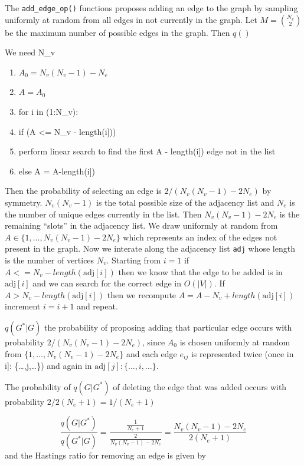 \documentclass[]{article}
\providecommand{\tightlist}{%
  \setlength{\itemsep}{0pt}\setlength{\parskip}{0pt}}
\numberwithin{equation}{section}
\begin{document}
The \texttt{add\_edge\_op()} functions proposes adding an edge to the
graph by sampling uniformly at random from all edges in not currently in
the graph. Let \(M = \binom{N_v}{2}\) be the maximum number of possible
edges in the graph. Then \(q()\)

We need N\_v

\begin{enumerate}
\def\labelenumi{\arabic{enumi}.}
\tightlist
\item
  \(A_0 = N_v(N_v-1) - N_e\)
\item
  \(A = A_0\)
\item
  for i in (1:N\_v):
\item
  if (A \textless{}= N\_v - length(\text{adj}{[}i{]}))
\item
  perform linear search to find the first A - length(\text{adj}{[}i{]})
  edge not in the list
\item
  else A = A-length(\text{adj}{[}i{]})
\end{enumerate}

Then the probability of selecting an edge is \(2/(N_v(N_v-1) - 2N_e)\)
by symmetry. \(N_v(N_v-1)\) is the total possible size of the adjacency
list and \(N_e\) is the number of unique edges currently in the list.
Then \(N_v(N_v-1) - 2N_e\) is the remaining ``slots'' in the adjacency
list. We draw uniformly at random from
\(A \in \{1,\dots,N_v(N_v-1) - 2N_e\}\) which represents an index of the
edges not present in the graph. Now we interate along the adjacency list
\texttt{adj} whose length is the number of vertices \(N_v\). Starting
from \(i = 1\) if \(A <= N_v - length(\text{adj}[i])\) then we know that
the edge to be added is in \(\text{adj}[i]\) and we can search for the
correct edge in \(O(|V|)\). If \(A > N_v - length(\text{adj}[i])\) then
we recompute \(A = A - N_v + length(\text{adj}[i])\) increment
\(i = i + 1\) and repeat.

\(q(G^*|G)\) the probability of proposing adding that particular edge
occurs with probability \(2/(N_v(N_v-1) - 2N_e)\), since \(A_0\) is
chosen uniformly at random from \(\{1,\dots,N_v(N_v-1) - 2N_e\}\) and
each edge \(e_{ij}\) is represented twice (once in \text{adj}{[}i{]}:
\{\dots,j,\dots\}) and again in \(\text{adj}[j]: \{\dots,i,\dots\}\).

The probability of \(q(G|G^*)\) of deleting the edge that was added
occurs with probability \(2/2(N_e+1) = 1/(N_e+1)\)

\[\frac{q(G|G^*)}{q(G^*|G)} = \frac{\frac{1}{N_e+1}}{\frac{2}{N_v(N_v-1) - 2N_e}} = \frac{N_v(N_v-1) - 2N_e}{2(N_e+1)} \]
and the Hastings ratio for removing an edge is given by
\end{document}
